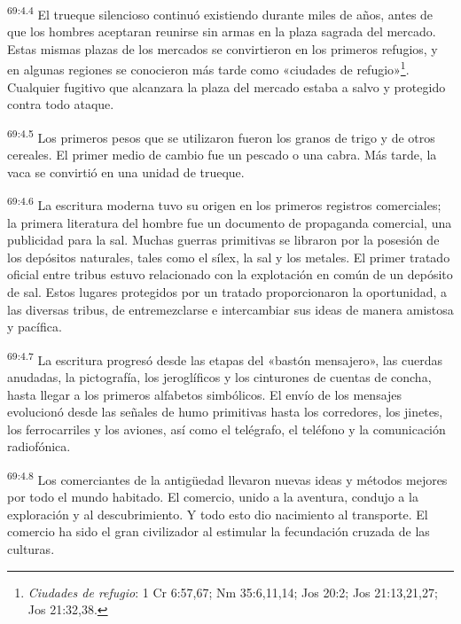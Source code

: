 \par
\textsuperscript{69:4.4} El trueque silencioso continuó existiendo durante miles de años, antes de que los hombres aceptaran reunirse sin armas en la plaza sagrada del mercado. Estas mismas plazas de los mercados se convirtieron en los primeros refugios, y en algunas regiones se conocieron más tarde como «ciudades de refugio»\footnote{\textit{Ciudades de refugio}: 1 Cr 6:57,67; Nm 35:6,11,14; Jos 20:2; Jos 21:13,21,27; Jos 21:32,38.}. Cualquier fugitivo que alcanzara la plaza del mercado estaba a salvo y protegido contra todo ataque.

\par
\textsuperscript{69:4.5} Los primeros pesos que se utilizaron fueron los granos de trigo y de otros cereales. El primer medio de cambio fue un pescado o una cabra. Más tarde, la vaca se convirtió en una unidad de trueque.

\par
\textsuperscript{69:4.6} La escritura moderna tuvo su origen en los primeros registros comerciales; la primera literatura del hombre fue un documento de propaganda comercial, una publicidad para la sal. Muchas guerras primitivas se libraron por la posesión de los depósitos naturales, tales como el sílex, la sal y los metales. El primer tratado oficial entre tribus estuvo relacionado con la explotación en común de un depósito de sal. Estos lugares protegidos por un tratado proporcionaron la oportunidad, a las diversas tribus, de entremezclarse e intercambiar sus ideas de manera amistosa y pacífica.

\par
\textsuperscript{69:4.7} La escritura progresó desde las etapas del «bastón mensajero», las cuerdas anudadas, la pictografía, los jeroglíficos y los cinturones de cuentas de concha, hasta llegar a los primeros alfabetos simbólicos. El envío de los mensajes evolucionó desde las señales de humo primitivas hasta los corredores, los jinetes, los ferrocarriles y los aviones, así como el telégrafo, el teléfono y la comunicación radiofónica.

\par
\textsuperscript{69:4.8} Los comerciantes de la antig\"uedad llevaron nuevas ideas y métodos mejores por todo el mundo habitado. El comercio, unido a la aventura, condujo a la exploración y al descubrimiento. Y todo esto dio nacimiento al transporte. El comercio ha sido el gran civilizador al estimular la fecundación cruzada de las culturas.

